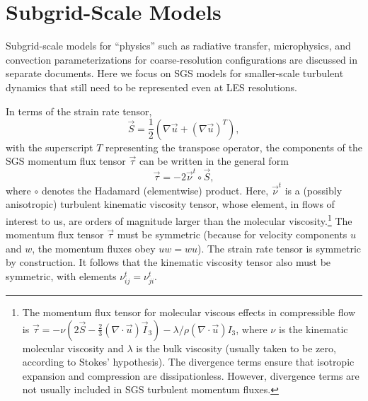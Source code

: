 \documentclass{article}
\begin{document}
\section{Subgrid-Scale Models}
\label{sec:sgs_models}

Subgrid-scale models for ``physics'' such as radiative transfer, microphysics, and convection parameterizations for coarse-resolution configurations are discussed in  separate documents. Here we focus on SGS models for smaller-scale turbulent dynamics that still need to be represented even at LES resolutions.

In terms of the strain rate tensor,
\begin{equation}
\vec{S} = \frac{1}{2}  \left(\nabla \vec{u} +  \left( \nabla \vec{u} \right)^T \right),
\end{equation}
with the superscript $T$ representing the transpose operator, the components of the SGS momentum flux tensor $\vec{\tau}$ can be written in the general form 
\begin{equation}\label{e:sgs_momentum_flux}
\vec{\tau} =  - 2 \vec{\nu}^t \circ \vec{S},
\end{equation}
where $\circ$ denotes the Hadamard (elementwise) product. Here, $\vec{\nu}^t$ is a (possibly anisotropic) turbulent kinematic viscosity tensor, whose element, in flows of interest to us, are orders of magnitude larger than the molecular viscosity.\footnote{The momentum flux tensor for molecular viscous effects in compressible flow is $\vec{\tau}  =  - \nu \left( 2\vec{S}  - \frac{2}{3} (\nabla \cdot \vec{u}) \vec{I}_3 \right) - \lambda/\rho (\nabla \cdot \vec{u}) I_3$, where $\nu$ is the kinematic molecular viscosity and $\lambda$ is the bulk viscosity (usually taken to be zero, according to Stokes' hypothesis). The divergence terms ensure that isotropic expansion and compression are dissipationless. However, divergence terms are not usually included in SGS turbulent momentum fluxes.} The momentum flux tensor $\vec{\tau}$ must be symmetric (because for velocity components $u$ and $w$, the momentum fluxes obey $uw = wu$). The strain rate tensor is symmetric by construction. It follows that the kinematic viscosity tensor also must be symmetric, with elements $\nu_{ij}^t = \nu_{ji}^t$.
\end{document}
